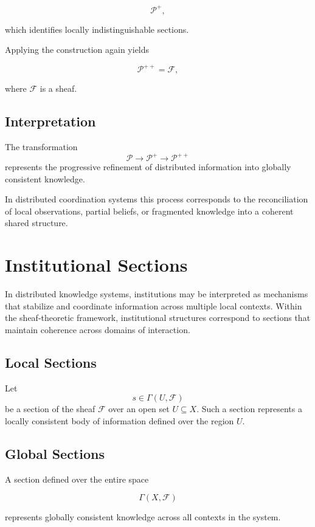 \documentclass[12pt]{article}
\begin{document}
\[
\mathcal{P}^+,
\]

which identifies locally indistinguishable sections.

Applying the construction again yields

\[
\mathcal{P}^{++} = \mathcal{F},
\]

where $\mathcal{F}$ is a sheaf.

\subsection{Interpretation}

The transformation
\[
\mathcal{P} \rightarrow \mathcal{P}^+ \rightarrow \mathcal{P}^{++}
\]
represents the progressive refinement of distributed information into globally consistent knowledge.

In distributed coordination systems this process corresponds to the reconciliation of local observations, partial beliefs, or fragmented knowledge into a coherent shared structure.

\section{Institutional Sections}

In distributed knowledge systems, institutions may be interpreted as mechanisms that stabilize and coordinate information across multiple local contexts. Within the sheaf-theoretic framework, institutional structures correspond to sections that maintain coherence across domains of interaction.

\subsection{Local Sections}

Let
\[
s \in \Gamma(U,\mathcal{F})
\]
be a section of the sheaf $\mathcal{F}$ over an open set $U \subseteq X$. Such a section represents a locally consistent body of information defined over the region $U$.

\subsection{Global Sections}

A section defined over the entire space

\[
\Gamma(X,\mathcal{F})
\]

represents globally consistent knowledge across all contexts in the system.
\end{document}
